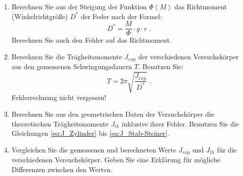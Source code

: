\begin{enumerate}
 \item Berechnen Sie aus der Steigung der Funktion $\Phi (M)$ das Richtmoment (Winkelrichtgröße) $D^*$ der Feder nach der Formel:
 \begin{equation}
 D^* = \frac{M}{\Phi}\cdot g\cdot r \; .
 \end{equation}
 Berechnen Sie auch den Fehler auf das Richtmoment.
 \item Berechnen Sie die Trägheitsmomente $J_{exp}$ der verschiedenen Versuchskörper aus den gemessenen Schwingungsdauern $T$. Benutzen Sie:
 \begin{equation}
 T = 2\pi\sqrt{\frac{J_{exp}}{D^*}} \; .
 \end{equation}
 Fehlerrechnung nicht vergessen!
 \item Berechnen Sie aus den geometrischen Daten der Versuchskörper die theoretischen Trägheitsmomente $J_{th}$ inklusive ihrer Fehler. Benutzen Sie die Gleichungen \ref{eq:J_Zylinder} bis \ref{eq:J_Stab-Steiner}.
 \item Vergleichen Sie die gemessenen und berechneten Werte $J_{exp}$ und $J_{th}$ für die verschiedenen Versuchskörper. Geben Sie eine Erklärung für mögliche Differenzen zwischen den Werten.
\end{enumerate}